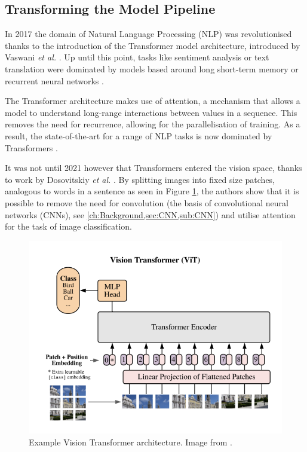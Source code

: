 \subsection{Transforming the Model Pipeline}\label{ch:Conclusion,sec:FutureWork,sub:Transformers}

In 2017 the domain of Natural Language Processing (NLP) was revolutionised thanks to the introduction of the Transformer model architecture, introduced by Vaswani \textit{et al.} \cite{vaswani_attention_2017}. Up until this point, tasks like sentiment analysis or text translation were dominated by models based around long short-term memory \cite{hochreiter_long_1997} or recurrent neural networks \cite{rumelhart_learning_1985}. 

The Transformer architecture makes use of attention, a mechanism that allows a model to understand long-range interactions between values in a sequence. This removes the need for recurrence, allowing for the parallelisation of training. As a result, the state-of-the-art for a range of NLP tasks is now dominated by Transformers \cite{brown_language_2020, devlin_bert_2019, ng_facebook_2019, wolf_transformers_2020}. 

It was not until 2021 however that Transformers entered the vision space, thanks to work by Dosovitskiy \textit{et al.} \cite{dosovitskiy_image_2021}. By splitting images into fixed size patches, analogous to words in a sentence as seen in Figure \ref{fig:vit}, the authors show that it is possible to remove the need for convolution (the basis of convolutional neural networks (CNNs), see \ref{ch:Background,sec:CNN,sub:CNN}) and utilise attention for the task of image classification. 

\begin{figure}[h]
	\begin{center}
		\includegraphics[scale=0.7]{Chapter7/figs/vit.png}
	\end{center}
	\caption{Example Vision Transformer architecture. Image from \cite{dosovitskiy_image_2021}.}
	\label{fig:vit}
\end{figure}


